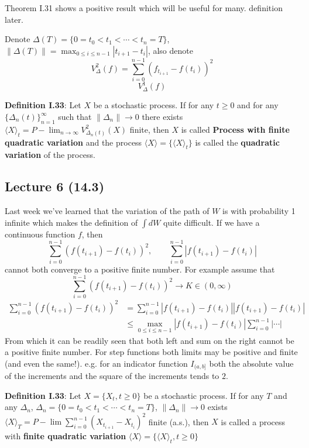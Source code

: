 \documentclass[english]{article}
\newcommand{\note}[1]{\noindent\textbf{#1}}
\begin{document}
Theorem I.31 shows a positive result which will be useful for many. definition later.

Denote $\Delta(T) = \{0= t_0 < t_1 < \cdots < t_n = T\}$, $\|\Delta(T)\| = \max_{0\leq i \leq n-1} |t_{i+1} - t_i|$, also denote
$$V^2_\Delta(f) = \sum^{n-1}_{i=0} (f_{t_{i+1}} - f(t_i))^2$$
$$V^1_\Delta(f)$$

\note{Definition I.33}: Let $X$ be a stochastic process. If for any $t\geq 0$ and for any $\{\Delta_n(t) \}^\infty_{n=1}$ such that $\|\Delta_n\|\to 0$ there exists $\langle X \rangle_t = P-\lim_{n\to \infty} V^2_{\Delta_n(t)} (X)$ finite, then $X$ is called \textbf{Process with finite quadratic variation} and the process $\langle X\rangle = \{\langle X\rangle_t\}$ is called the \textbf{quadratic variation} of the process. \newline

\subsection*{Lecture 6 (14.3)}
Last week we've learned that the variation of the path of $W$ is with probability 1 infinite which makes the definition of $\int dW$ quite difficult. \newline
If we have a continuous function $f$, then $$\sum^{n-1}_{i=0} (f(t_{i+1}) - f(t_i))^2, \quad\quad \sum^{n-1}_{i=0} | f(t_{i+1}) - f(t_i)|$$
cannot both converge to a positive finite number. For example assume that  $$\sum^{n-1}_{i=0} (f(t_{i+1}) - f(t_i))^2 \to K \in (0,\infty)$$
\begin{align*} \sum^{n-1}_{i=0} (f(t_{i+1}) - f(t_i))^2 &= \sum^{n-1}_{i=0} |f(t_{i+1}) - f(t_i)||f(t_{i+1}) - f(t_i)|\\
& \leq \max_{0\leq i \leq n-1} |f(t_{i+1}) - f(t_i)| \sum^{n-1}_{i=0} | \cdots |
\end{align*}
From which it can be readily seen that both left and sum on the right cannot be a positive finite number. \newline
For step functions both limits may be positive and finite (and even the same!). e.g. for an indicator function $I_{(a,b]}$ both the absolute value of the increments and the square of the increments tends to $2$. \newline

\note{Definition I.33}: Let $X=\{X_t, t\geq 0\}$ be a stochastic process. If for any $T$ and any $\Delta_n$, $\Delta_n = \{0 = t_0 < t_1 <\cdots < t_n = T\}$, $\|\Delta_n\| \to 0$ exists $\langle X\rangle_T = P-\lim \sum^{n-1}_{i=0} (X_{t_{i+1}} - X_{t_i})^2$ finite (a.s.), then $X$ is called a process with \textbf{finite quadratic variation} $\langle X \rangle = \{\langle X \rangle_t, t\geq 0\}$\newline
\end{document}
